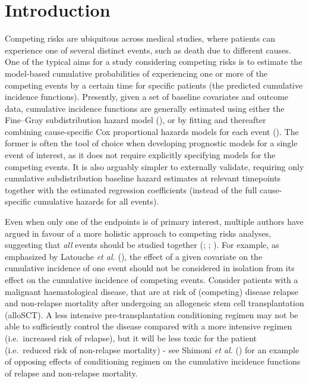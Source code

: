 \documentclass[
  letterpaper,
  DIV=11,
  numbers=noendperiod]{scrreprt}
\begin{document}
\hfill\break

\section{Introduction}\label{introduction-3}

Competing risks are ubiquitous across medical studies, where patients
can experience one of several distinct events, such as death due to
different causes. One of the typical aims for a study considering
competing risks is to estimate the model-based cumulative probabilities
of experiencing one or more of the competing events by a certain time
for specific patients (the predicted cumulative incidence functions).
Presently, given a set of baseline covariates and outcome data,
cumulative incidence functions are generally estimated using either the
Fine--Gray subdistribution hazard model
(),
or by fitting and thereafter combining cause-specific Cox proportional
hazards models for each event
(). The former is often the tool of choice when developing
prognostic models for a single event of interest, as it does not require
explicitly specifying models for the competing events. It is also
arguably simpler to externally validate, requiring only cumulative
subdistribution baseline hazard estimates at relevant timepoints
together with the estimated regression coefficients (instead of the full
cause-specific cumulative hazards for all events).

Even when only one of the endpoints is of primary interest, multiple
authors have argued in favour of a more holistic approach to competing
risks analyses, suggesting that \emph{all} events should be studied
together (;
; ). For example, as emphasized by Latouche \emph{et
al.} (), the
effect of a given covariate on the cumulative incidence of one event
should not be considered in isolation from its effect on the cumulative
incidence of competing events. Consider patients with a malignant
haematological disease, that are at risk of (competing) disease relapse
and non-relapse mortality after undergoing an allogeneic stem cell
transplantation (alloSCT). A less intensive pre-transplantation
conditioning regimen may not be able to sufficiently control the disease
compared with a more intensive regimen (i.e.~increased risk of relapse),
but it will be less toxic for the patient (i.e.~reduced risk of
non-relapse mortality) - see Shimoni \emph{et al.}
() for an example of
opposing effects of conditioning regimen on the cumulative incidence
functions of relapse and non-relapse mortality.
\end{document}
